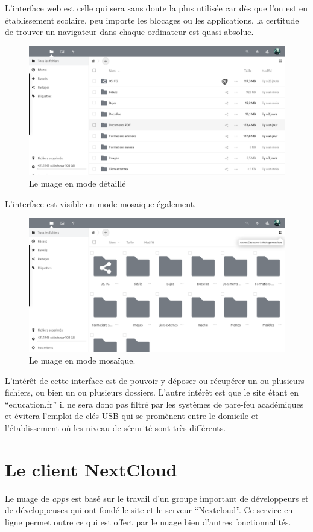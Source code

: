 L'interface web est celle qui sera sans doute la plus utilisée car dès que l'on est en établissement scolaire, peu importe les blocages ou les applications, la certitude de trouver un navigateur dans chaque ordinateur est quasi absolue.
\begin{figure}
	\centering
	\includegraphics[width=\linewidth]{./Captures/nuage.accueil.png}
	\caption{Le nuage en mode détaillé}
\end{figure}
L'interface est visible en mode mosaïque également.
\begin{figure}
	\centering
	\includegraphics[width=\linewidth]{./Captures/nuage.accueil.mozaique.png}
	\caption{Le nuage en mode mosaïque.}
\end{figure}
L'intérêt de cette interface est de pouvoir y déposer ou récupérer un ou plusieurs fichiers, ou bien un ou plusieurs dossiers. 
L'autre intérêt est que le site étant en ``education.fr'' il ne sera donc pas filtré par les systèmes de pare-feu académiques et évitera l'emploi de clés USB qui se promènent entre le domicile et l'établissement où les niveau de sécurité sont très différents.

\section*{Le client NextCloud}
Le nuage de \emph{apps} est basé sur le travail d'un groupe important de développeurs et de développeuses qui ont fondé le site et le serveur ``Nextcloud''. 
Ce service en ligne permet outre ce qui est offert par le nuage bien d'autres fonctionnalités. 

